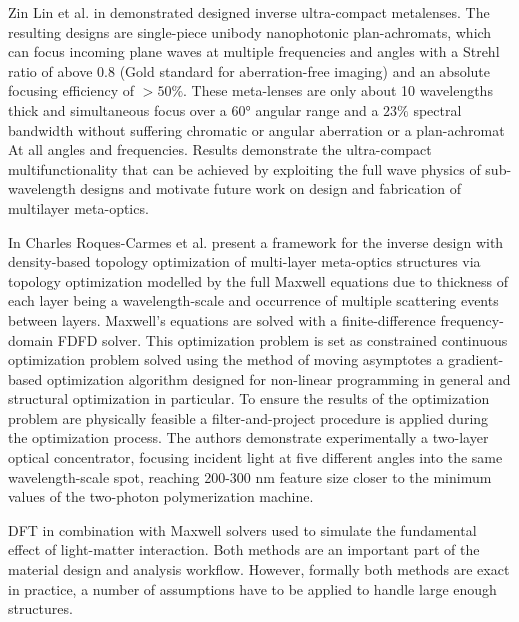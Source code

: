 Zin Lin et al. in \cite{linComputationalInverseDesign2021} demonstrated designed inverse ultra-compact metalenses. The resulting designs are single-piece unibody nanophotonic plan-achromats, which can focus incoming plane waves at multiple frequencies and angles with a Strehl ratio of above 0.8 (Gold standard for aberration-free imaging)  and an absolute focusing efficiency of $>50\%$. These meta-lenses are only about 10 wavelengths thick and simultaneous focus over a 60° angular range and a $23\%$ spectral bandwidth without suffering chromatic or angular aberration or a plan-achromat At all angles and frequencies. Results demonstrate the ultra-compact multifunctionality that can be achieved by exploiting the full wave physics of sub-wavelength designs and motivate future work on design and fabrication of multilayer meta-optics.

In \cite{roques-carmes3DPrintedInverseDesignedMetaoptics2022} Charles Roques-Carmes et al. present a framework for the inverse design with density-based topology optimization \cite{bendsoeTopologyOptimization2004, jensenTopologyOptimizationNanophotonics2011} of multi-layer meta-optics structures via topology optimization modelled by the full Maxwell equations due to thickness of each layer being a wavelength-scale and occurrence of multiple scattering events between layers. Maxwell's equations are solved with a finite-difference frequency-domain FDFD solver. This optimization problem is set as constrained continuous optimization problem solved using the method of moving asymptotes \cite{svanbergMethodMovingAsymptotes1987} a gradient-based optimization algorithm designed for non-linear programming in general and structural optimization in particular. To ensure the results of the optimization problem are physically feasible a filter-and-project procedure is applied during the optimization process. The authors demonstrate experimentally a two-layer optical concentrator, focusing incident light at five different angles into the same wavelength-scale spot, reaching 200-300 nm feature size closer to the minimum values of the two-photon polymerization machine.

DFT in combination with Maxwell solvers used to simulate the fundamental effect of light-matter interaction. Both methods are an important part of the material design and analysis workflow. However, formally both methods are exact in practice, a number of assumptions have to be applied \cite{aaronsPerspectiveMethodsLargescale2016} to handle large enough structures.


